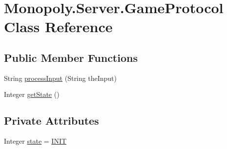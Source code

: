 \hypertarget{class_monopoly_1_1_server_1_1_game_protocol}{}\section{Monopoly.\+Server.\+Game\+Protocol Class Reference}
\label{class_monopoly_1_1_server_1_1_game_protocol}
\subsection*{Public Member Functions}
\begin{DoxyCompactItemize}
\item 
String \hyperlink{class_monopoly_1_1_server_1_1_game_protocol_ac145ed5c76fbff79218a9d9c6ced0698}{process\+Input} (String the\+Input)
\item 
Integer \hyperlink{class_monopoly_1_1_server_1_1_game_protocol_aa2af1d78e88ffd885ea18b67b82d2be7}{get\+State} ()
\end{DoxyCompactItemize}
\subsection*{Private Attributes}
\begin{DoxyCompactItemize}
\item 
Integer \hyperlink{class_monopoly_1_1_server_1_1_game_protocol_ad96dd410c80756d63c446a70222dec2d}{state} = \hyperlink{class_monopoly_1_1_server_1_1_game_protocol_a3a3f1fded8c4f1f318e17e12ab184611}{I\+N\+IT}
\end{DoxyCompactItemize}
